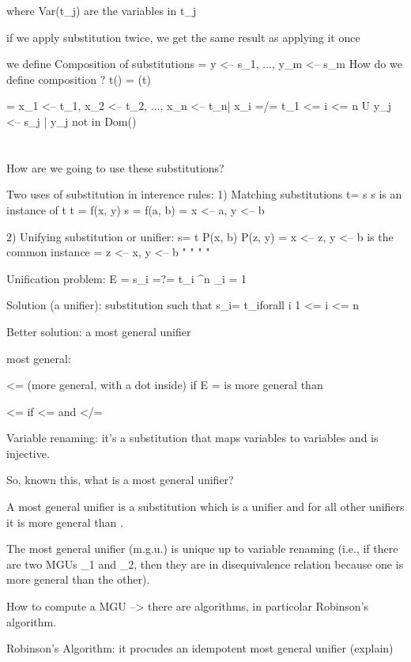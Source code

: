 \documentclass[11pt,a4paper]{article}
\theoremstyle{definition}
\theoremstyle{plain}
\theoremstyle{remark}
\begin{document}
where Var(t_j) are the variables in t_j 

if we apply substitution twice, we get the same result as applying it once 

we define Composition of substitutions \Theta = { y <-- s_1, ..., y_m <-- s_m }
How do we define \sigma composition \Theta?
t(\sigma \dot \Theta) = (t\sigma)\Theta 

\sigma \dot \Theta = { x_1 <-- t_1\Theta, x_2 <-- t_2\Theta, ..., x_n <-- t_n\Theta | x_i =/= t_1 <= i <= n } U { y_j <-- s_j | y_j not in Dom(\sigma) }




\section{}

How are we going to use these substitutions?

Two uses of substitution in interence rules:
1) Matching substitutions    t\sigma = s     s is an instance of t 
t = f(x, y)     s = f(a, b)
\sigma = { x <-- a, y <-- b }

2) Unifying substitution or unifier:     s\sigma = t\sigma
P(x, b)     P(z, y)
\sigma = { x <-- z, y <-- b } is the common instance 
\sigma = { z <-- x, y <-- b } "   "    "     "


Unification problem: E = { s_i =?= t_i }^n _{i = 1}

Solution (a unifier): substitution \sigma such that s_i\sigma = t_i\sigma forall i 1 <= i <= n 

Better solution: a most general unifier 

most general:

\sigma <= (more general, with a dot inside) \Theta if E \rho \sigma \dot \rho = \Theta    \sigma is more general than \Theta

\sigma <= \Theta if \sigma <= \Theta and \Theta </= \sigma



Variable renaming: it's a substitution that maps variables to variables and is injective.



So, known this, what is a most general unifier?

A most general unifier is a substitution \sigma which is a unifier and for all other unifiers \Theta it is \sigma more general than \Theta.

The most general unifier (m.g.u.) is unique up to variable renaming (i.e., if there are two MGUs \sigma_1 and \sigma_2, then they are in disequivalence relation because one is more general than the other).


How to compute a MGU --> there are algorithms, in particolar Robinson's algorithm.

Robinson's Algorithm: it procudes an idempotent most general unifier 
(explain)
\end{document}
